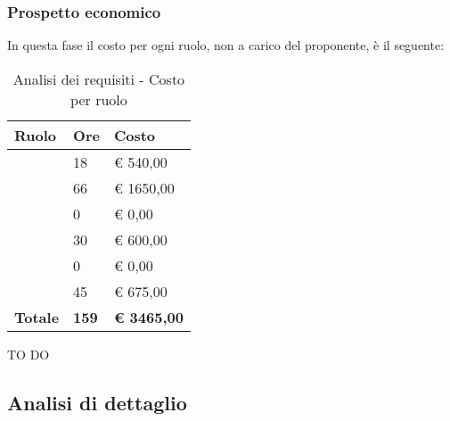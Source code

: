 		\subsubsection{Prospetto economico} %
		\label{ssub:prospetto_economico}
		In questa fase il costo per ogni ruolo, non a carico del proponente, è il seguente: \\
			\begin{table}[!h]
				\begin{center}
					\begin{tabularx}{0.65\textwidth}{|l|l|X|}
						\hline
						\textbf{Ruolo} & \textbf{Ore} & \textbf{Costo} \\
						\hline
						\roleProjectManager & 18 & \euro{} 540,00 \\
						\hline
						\roleAnalyst & 66 & \euro{} 1650,00 \\
						\hline
						\roleDesigner & 0 & \euro{} 0,00 \\
						\hline
						\roleAdministrator & 30 & \euro{} 600,00 \\
						\hline
						\roleProgrammer & 0 & \euro{} 0,00 \\
						\hline
						\roleVerifier & 45 & \euro{} 675,00 \\
						\hline
						\textbf{Totale} & \textbf{159} & \textbf{\euro{} 3465,00} \\
						\hline
					\end{tabularx}
				\end{center}
			\caption{Analisi dei requisiti - Costo per ruolo}
			\end{table}
			
		\noindent
		TO DO
		
	
	\subsection{Analisi di dettaglio} %
	\label{sub:analisi_di_dettaglio}
